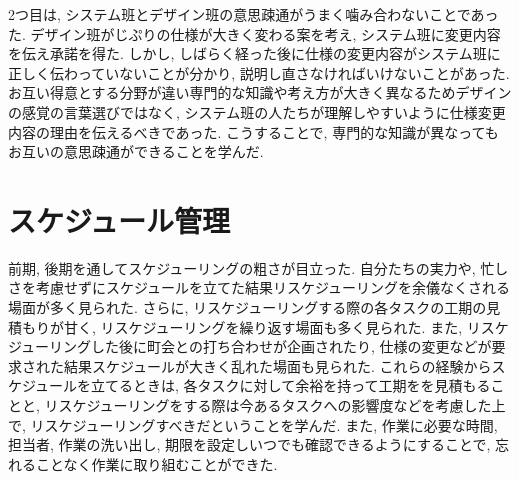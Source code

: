 2つ目は, システム班とデザイン班の意思疎通がうまく噛み合わないことであった.
デザイン班がじぷりの仕様が大きく変わる案を考え, システム班に変更内容を伝え承諾を得た. しかし, しばらく経った後に仕様の変更内容がシステム班に正しく伝わっていないことが分かり,
説明し直さなければいけないことがあった. お互い得意とする分野が違い専門的な知識や考え方が大きく異なるためデザインの感覚の言葉選びではなく,
システム班の人たちが理解しやすいように仕様変更内容の理由を伝えるべきであった. こうすることで, 専門的な知識が異なってもお互いの意思疎通ができることを学んだ.

\section{スケジュール管理}
前期, 後期を通してスケジューリングの粗さが目立った. 自分たちの実力や, 忙しさを考慮せずにスケジュールを立てた結果リスケジューリングを余儀なくされる場面が多く見られた. さらに, リスケジューリングする際の各タスクの工期の見積もりが甘く, リスケジューリングを繰り返す場面も多く見られた. また, リスケジューリングした後に町会との打ち合わせが企画されたり, 仕様の変更などが要求された結果スケジュールが大きく乱れた場面も見られた.	
これらの経験からスケジュールを立てるときは, 各タスクに対して余裕を持って工期をを見積もることと, リスケジューリングをする際は今あるタスクへの影響度などを考慮した上で, リスケジューリングすべきだということを学んだ. また, 作業に必要な時間, 担当者, 作業の洗い出し, 期限を設定しいつでも確認できるようにすることで, 忘れることなく作業に取り組むことができた.
